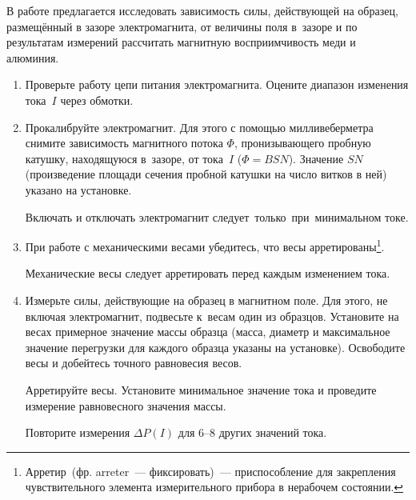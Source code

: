 \begin{lab:task}

В работе предлагается исследовать зависимость силы, действующей на образец,
размещённый в зазоре электромагнита, от
величины поля в~зазоре и по результатам измерений рассчитать магнитную
восприимчивость меди и алюминия.

\begin{enumerate}


\item Проверьте работу цепи питания электромагнита. Оцените диапазон изменения
тока~$I$ через обмотки.

\item Прокалибруйте электромагнит. Для этого с помощью милливеберметра снимите
зависимость магнитного потока $\Phi$,
пронизывающего пробную катушку, находящуюся в~зазоре, от тока~$I$ ($\Phi=BSN$).
Значение $SN$ (произведение площади
сечения пробной катушки на число витков в ней) указано на установке.

\begin{lab:warning}
	Включать и отключать электромагнит следует~только~при~минимальном токе.
\end{lab:warning}

\item При работе с механическими весами убедитесь,
что весы арретированы\footnote{Арретир~(фр. arreter~---
фиксировать)~--- приспособление для закрепления
чувствительного элемента измерительного прибора в нерабочем состоянии.}.

\begin{lab:warning}
	Механические весы следует арретировать перед каждым изменением тока.
\end{lab:warning}

\item \label{item:4} Измерьте силы, действующие на образец в магнитном поле. Для
этого, не включая электромагнит, подвесьте к~весам
один из образцов. Установите на весах примерное значение массы образца (масса,
диаметр и максимальное значение
перегрузки для каждого образца указаны на установке). Освободите весы и
добейтесь точного равновесия весов.

Арретируйте весы. Установите минимальное значение тока и проведите измерение
равновесного значения массы.

Повторите измерения $\Delta P(I)$ для 6--8 других значений тока.


\end{enumerate}
\end{lab:task}
